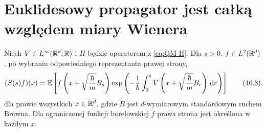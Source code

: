 \section{Euklidesowy propagator jest całką względem miary Wienera}

\begin{twierdzenie}
\label{th:physical-FK}
Niech $V\in L^\infty(\mathbb{R}^d;\mathbb{R})$ i $H$ będzie operatorem
z \eqref{eq:QM-H}. Dla $s>0$, $f\in L^2(\mathbb{R}^d)$,
po wybraniu odpowiedniego reprezentanta prawej strony,
\[
 (S(s)f)(x)=\mathbb{E}\left[
 f\left(x+\sqrt{\frac{\hbar}{m}}B_s\right)
 \exp\left(-\frac1\hbar\int_0^s
 V\left(x+\sqrt{\frac{\hbar}{m}}B_r\right)\,\mathrm{d} r\right)
 \right]
\tag{16.3}\label{eq:physical-FK}
\]
dla prawie wszystkich $x\in\mathbb{R}^d$, gdzie $B$ jest
$d$-wymiarowym standardowym ruchem Browna.
Dla ograniczonej funkcji borelowskiej $f$ prawa strona
jest określona w każdym $x$.
\end{twierdzenie}
